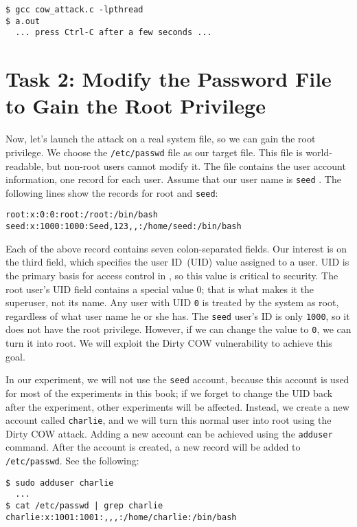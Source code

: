 \begin{lstlisting}
$ gcc cow_attack.c -lpthread
$ a.out
  ... press Ctrl-C after a few seconds ...
\end{lstlisting}



\section{Task 2: Modify the Password File to Gain the Root Privilege} 

Now, let's launch the attack on a real system file, so we can gain the root privilege.
We choose the \texttt{/etc/passwd} file as our target file. This file
is world-readable, but non-root users cannot modify it. The file contains
the user account information, one record for each user.  Assume that our user name is
\texttt{seed} . The following lines show the records for root and \texttt{seed}:

\begin{lstlisting}
root:x:0:0:root:/root:/bin/bash
seed:x:1000:1000:Seed,123,,:/home/seed:/bin/bash
\end{lstlisting}

Each of the above record contains seven colon-separated fields. Our interest is on the third
field, which specifies the user ID~(UID) value assigned to a user. UID is the primary
basis for access control in \linux, so this value is critical to security.
The root user's UID field contains a special value 0; that is what makes it the superuser,
not its name. Any user with UID \texttt{0} is treated by the system as root,
regardless of what user name he or she has.
The \texttt{seed} user's ID is only \texttt{1000}, so
it does not have the root privilege. However, if we can change the value to
\texttt{0}, we can turn it
into root. We will exploit the Dirty COW vulnerability to achieve this goal.

In our experiment, we will not use the \texttt{seed} account, because this account is used
for most of the experiments in this book; if we forget to change the UID back after the
experiment, other experiments will be affected.  Instead, we create a new account called
\texttt{charlie}, and we will turn this normal user into root using
the Dirty COW attack.
Adding a new account can be achieved using the \texttt{adduser} command.
After the account is created, a new
record will be added to \texttt{/etc/passwd}.  See
the following:

\begin{lstlisting}
$ sudo adduser charlie
  ...
$ cat /etc/passwd | grep charlie
charlie:x:1001:1001:,,,:/home/charlie:/bin/bash
\end{lstlisting}

